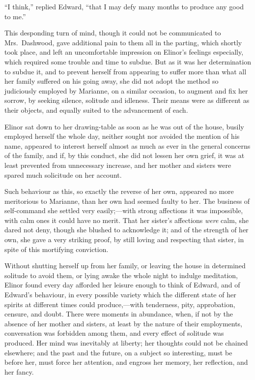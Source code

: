 ``I think,'' replied Edward, ``that I may defy many
months to produce any good to me.''

This desponding turn of mind, though it could not
be communicated to Mrs.\ Dashwood, gave additional pain
to them all in the parting, which shortly took place,
and left an uncomfortable impression on Elinor's
feelings especially, which required some trouble and time
to subdue.  But as it was her determination to subdue it,
and to prevent herself from appearing to suffer more than
what all her family suffered on his going away, she did
not adopt the method so judiciously employed by Marianne,
on a similar occasion, to augment and fix her sorrow,
by seeking silence, solitude and idleness.  Their means
were as different as their objects, and equally suited
to the advancement of each.

Elinor sat down to her drawing-table as soon as he
was out of the house, busily employed herself the whole day,
neither sought nor avoided the mention of his name,
appeared to interest herself almost as much as ever in the
general concerns of the family, and if, by this conduct,
she did not lessen her own grief, it was at least prevented
from unnecessary increase, and her mother and sisters
were spared much solicitude on her account.

Such behaviour as this, so exactly the reverse
of her own, appeared no more meritorious to Marianne,
than her own had seemed faulty to her.  The business
of self-command she settled very easily;---with strong
affections it was impossible, with calm ones it could
have no merit.  That her sister's affections \emph{were} calm,
she dared not deny, though she blushed to acknowledge it;
and of the strength of her own, she gave a very striking proof,
by still loving and respecting that sister, in spite
of this mortifying conviction.

Without shutting herself up from her family,
or leaving the house in determined solitude to avoid them,
or lying awake the whole night to indulge meditation,
Elinor found every day afforded her leisure enough
to think of Edward, and of Edward's behaviour, in every
possible variety which the different state of her spirits
at different times could produce,---with tenderness,
pity, approbation, censure, and doubt.  There were moments
in abundance, when, if not by the absence of her mother
and sisters, at least by the nature of their employments,
conversation was forbidden among them, and every effect
of solitude was produced.  Her mind was inevitably
at liberty; her thoughts could not be chained elsewhere;
and the past and the future, on a subject so interesting,
must be before her, must force her attention, and engross
her memory, her reflection, and her fancy.

